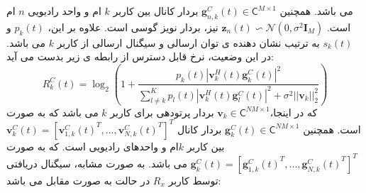 می باشد. 
 همچنین 
 $\boldsymbol{g}_{n,k}^{C}(t) \in \mathsf{C}^{M\times 1}$
 بردار کانال بین  کاربر $k$ ام  و  واحد رادیویی $n$ ام است.  
 $\boldsymbol{z}_n(t) \backsim \mathcal{N}(0,\sigma^2 \boldsymbol{I}_M )$
 نیز، بردار نویز گوسی است.
علاوه بر این، $p_k(t)$ و $s_k(t)$ به ترتیب نشان دهنده ی توان ارسالی و سیگنال ارسالی از کاربر $k$  می باشد. 
 در این وضعیت، نرخ قابل دسترس از رابطه ی زیر بدست می آید:
\begin{equation}
R^{C}_k(t) = \log_2(1+ \frac{p_k(t) |\boldsymbol{v}_{k}^{H}(t) \boldsymbol{g}_{k}^{C}(t)|^2 }{ \sum_{l\neq k}^{K}p_l(t) |\boldsymbol{v}_{k}^{H}(t) \boldsymbol{g}_{l}^{C}(t)|^2 + \sigma^2 || \boldsymbol{v}_{k}||^2_2})
\end{equation}
که در اینجا،$\boldsymbol{v}_{k} \in \mathsf{C}^{NM\times 1}$ بردار پرتودهی برای کاربر $k$ می باشد
که به صورت \\
 $\boldsymbol{v}_{k}^{C}(t) = [{\boldsymbol{v}_{1,k}^{C}(t)}^T, ... , {\boldsymbol{v}_{N,k}^{C}(t)}^T ]^T$
است. 
 همچنین 
 $\boldsymbol{g}_{k}^{C}(t) \in \mathsf{C}^{NM \times 1}$
 بردار کانال بین کاربر $k$ام و واحدهای رادیویی است.\newline
  که به صورت 
  $\boldsymbol{g}_{k}^{C}(t) = [{\boldsymbol{g}_{1,k}^{C}(t)}^T, ... , {\boldsymbol{g}_{N,k}^{C}(t)}^T ]^T$
 می باشد.
 به صورت مشابه، سیگنال دریافتی توسط کاربر $R_x$ در حالت  به صورت مقابل می باشد:

